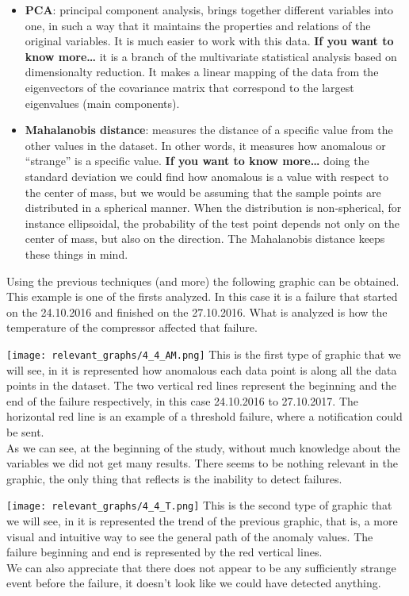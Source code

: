 \documentclass[
]{article}
\begin{document}
\begin{itemize}
\item
  \textbf{PCA}: principal component analysis, brings together different
  variables into one, in such a way that it maintains the properties and
  relations of the original variables. It is much easier to work with
  this data. \textbf{If you want to know more\ldots{}} it is a branch of
  the multivariate statistical analysis based on dimensionalty
  reduction. It makes a linear mapping of the data from the eigenvectors
  of the covariance matrix that correspond to the largest eigenvalues
  (main components).
\item
  \textbf{Mahalanobis distance}: measures the distance of a specific
  value from the other values in the dataset. In other words, it
  measures how anomalous or ``strange'' is a specific value. \textbf{If
  you want to know more\ldots{}} doing the standard deviation we could
  find how anomalous is a value with respect to the center of mass, but
  we would be assuming that the sample points are distributed in a
  spherical manner. When the distribution is non-spherical, for instance
  ellipsoidal, the probability of the test point depends not only on the
  center of mass, but also on the direction. The Mahalanobis distance
  keeps these things in mind.
\end{itemize}

Using the previous techniques (and more) the following graphic can be
obtained.\\
This example is one of the firsts analyzed. In this case it is a failure
that started on the 24.10.2016 and finished on the 27.10.2016. What is
analyzed is how the temperature of the compressor affected that failure.

\texttt{[image: relevant\_graphs/4\_4\_AM.png]} This is the first type of
graphic that we will see, in it is represented how anomalous each data
point is along all the data points in the dataset. The two vertical red
lines represent the beginning and the end of the failure respectively,
in this case 24.10.2016 to 27.10.2017. The horizontal red line is an
example of a threshold failure, where a notification could be sent.\\
As we can see, at the beginning of the study, without much knowledge
about the variables we did not get many results. There seems to be
nothing relevant in the graphic, the only thing that reflects is the
inability to detect failures.

\texttt{[image: relevant\_graphs/4\_4\_T.png]} This is the second type of
graphic that we will see, in it is represented the trend of the previous
graphic, that is, a more visual and intuitive way to see the general
path of the anomaly values. The failure beginning and end is represented
by the red vertical lines.\\
We can also appreciate that there does not appear to be any sufficiently
strange event before the failure, it doesn't look like we could have
detected anything.
\end{document}
